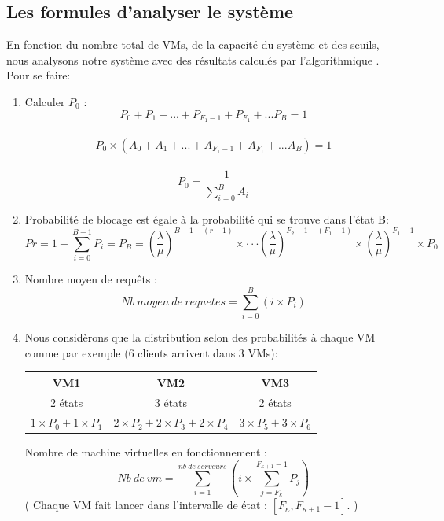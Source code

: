 \subsection{Les formules d'analyser le système}
\noindent En fonction du nombre total de VMs, de la capacité du système et des seuils, nous analysons notre système avec des résultats calculés par l'algorithmique . Pour se faire: 
\begin{enumerate}
\item Calculer $P_{0}$ :
\begin{equation}
P_{0} + P_{1} + ... + P_{F_{1}-1} + P_{F_{1}} + ... P_{B} = 1
\end{equation} \\
\begin{equation}
P_{0} \times \left (  A_{0} + A_{1} + ... + A_{F_{1}-1} + A_{F_{1}} + ... A_{B} \right ) = 1 
\end{equation}\\
\begin{equation}
P_{0}=\frac{1}{\sum_{i=0}^{B} A_{i}}
\end{equation}

\item Probabilit\'e de blocage est égale à la probabilité qui se trouve dans l'état B:
\begin{equation}
    Pr = 1-\sum_{i=0}^{B-1}P_{i} = P_{B} = \left ( \frac{\lambda}{\mu}\right )^{B-1-\left ( r-1\right )}\times \cdot \cdot \cdot  \left ( \frac{\lambda}{\mu}\right )^{F_{2}-1-\left ( F_{1}-1\right )}\times \left ( \frac{\lambda}{\mu}\right )^{F_{1}-1}\times P_{0}
\end{equation}
\item Nombre moyen de requêts :
\citep{adams2015hitchhiker}
\begin{equation}
Nb\: moyen\: de\: requetes =\sum_{i=0}^{B}\left (i \times P_{i} \right ) 
\end{equation} 

\item Nous considèrons que la distribution selon des probabilités à chaque VM comme par exemple (6 clients arrivent dans 3 VMs):

\begin{center}
\begin{tabular}{ |c|c|c| } 
 \hline
 VM1 & VM2 & VM3 \\ 
 \hline
 2 états & 3 états & 2 états\\
 \hline
 $1 \times P_{0} + 1 \times P_{1} $&$ 2 \times P_{2} + 2 \times P_{3}+ 2 \times P_{4}$ & $ 3 \times P_{5}+3 \times P_{6}$ \\ 
 \hline
\end{tabular}
\end{center}

\noindent Nombre de machine virtuelles en fonctionnement :
\begin{equation}
Nb\:de\: vm = \sum_{i=1}^{nb\: de\: serveurs}\left (i\times \sum_{j=F_{\kappa}}^{F_{\kappa +1}-1}P_{j} \right )
\end{equation}
\noindent  ( Chaque VM fait lancer dans l’intervalle de état : $\left [ F_{\kappa},F_{\kappa +1}-1 \right ]$. )
\end{enumerate}

















 



